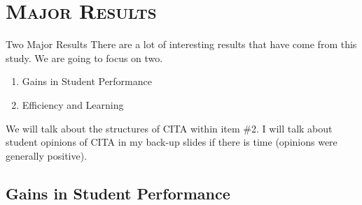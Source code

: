 \documentclass[xcolor=x11names,compress]{beamer}
\begin{document}
\section{\scshape Major Results}

\begin{frame}{Two Major Results}
	There are a lot of interesting results that have come from this study. We are going to focus on two.
	\vspace{2mm}
	\begin{enumerate}
		\item Gains in Student Performance
		\item Efficiency and Learning
	\end{enumerate}
	\vspace{5mm}
	We will talk about the structures of CITA within item \#2. I will talk about student opinions of CITA in my back-up slides if there is time (opinions were generally positive).
\end{frame}

\subsection{Gains in Student Performance}
\end{document}
